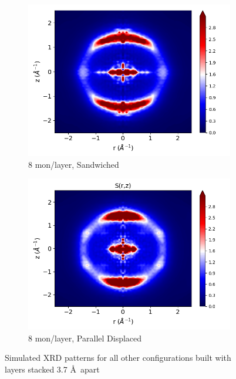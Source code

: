 \documentclass{article}
\begin{document}
\begin{figure}
\begin{subfigure}{0.40\textwidth}
                \includegraphics[width=\textwidth]{rzplot_layered_8.png}
                \caption{8 mon/layer, Sandwiched}\label{fig:rzplot_layered_8}
        \end{subfigure}
        \begin{subfigure}{0.40\textwidth}
                \centering
                \includegraphics[width=\textwidth]{rzplot_offset_8.png}
                \caption{8 mon/layer, Parallel Displaced}\label{fig:rzplot_offset_8}
        \end{subfigure}
	\caption{Simulated XRD patterns for all other configurations built with
		 layers stacked 3.7 \AA~apart}\label{fig:XRDsim}
  \end{figure}
\end{document}
